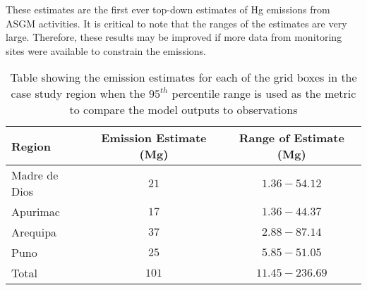 
\begin{flushleft}
    These estimates are the first ever top-down estimates of Hg emissions from ASGM activities. It is critical to note that the ranges of the estimates are very large. Therefore, these results may be improved if more data from monitoring sites were available to constrain the emissions. 
\end{flushleft}    
\begin{table}[H]
\caption{Table showing the emission estimates for each of the grid boxes in the case study region when the $95^{th}$ percentile range is used as the metric to compare the model outputs to observations}
    \label{tab:MCMC_estimates}
\begin{tabular}{lcc}

\textbf{Region}        & \textbf{Emission Estimate (Mg)}  &     \textbf{Range of Estimate (Mg)}                      \\
\hline
Madre de Dios          & $21$                               & $1.36 - 54.12$\\

Apurimac               & $17$                               & $1.36 - 44.37$\\

Arequipa               & $37$                               & $2.88 - 87.14$\\

Puno                    & $25$                              & $5.85 - 51.05$\\
\hline
Total                  & $101$                            &  $11.45 - 236.69$ \\
\hline
\end{tabular}
\centering
\end{table}

